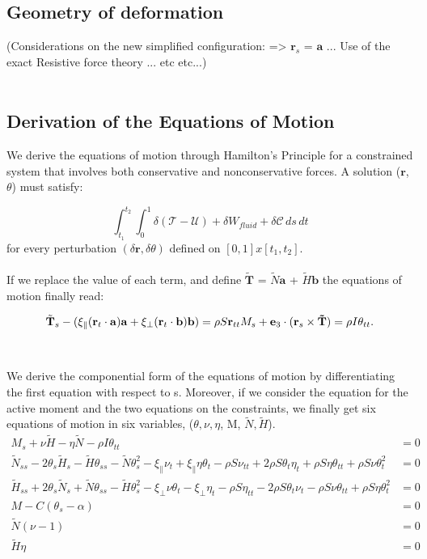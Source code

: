 \subsection{Geometry of deformation}
(Considerations on the new simplified configuration: => $\mathbf{r}_s$ = $\mathbf{a}$ ... Use of the exact Resistive force theory  ... etc etc...)
\\\\
\subsection{Derivation of the Equations of Motion}
We derive the equations of motion through Hamilton's Principle for a constrained system that involves both conservative and nonconservative forces. A solution ($\mathbf{r}$,$\theta$) must satisfy:

\[\int_{t_1}^{t_2} \int_{0}^{1} \delta (\mathcal{T}-\mathcal{U}) + \delta W_{fluid} + \delta \mathcal{C} \, ds \,dt
\]
for every perturbation $(\delta \mathbf{r}, \delta \theta)$ defined on $[0,1]x[t_1,t_2]$. 
\\\\
If we replace the value of each term, and define $\tilde{\mathbf{T}}$ = $\tilde{N}\mathbf{a}$ + $\tilde{H}\mathbf{b}$  the equations of motion finally read:

\[ \tilde{\mathbf{T}}_s - (\xi_\parallel (\mathbf{r}_t\cdot\mathbf{a})\mathbf{a} + \xi_\perp (\mathbf{r}_t\cdot\mathbf{b})\mathbf{b}) = \rho S \mathbf{r}_{tt}\\

M_s + \mathbf{e}_3 \cdot(\mathbf{r}_s \times \mathbf{\tilde{T}}) =\rho I \theta_{tt}.
\]
\\\\
We derive the componential form of the equations of motion by differentiating the first equation with respect to s.
Moreover, if we consider the equation for the active moment and the two equations on the constraints, we finally get six equations of motion in six variables, ($\theta,\nu,\eta$, M, $\tilde{N},\tilde{H}$).
\begin{align}
M_s + \nu \tilde{H} -\eta \tilde{N} - \rho I \theta_{tt}
&= 0\\
\tilde{N}_{ss} - 2\theta_s\tilde{H}_s - \tilde{H}\theta_{ss}- \tilde{N}\theta_s^2
- \xi_{\parallel}\nu_t + \xi_{\parallel}\eta\theta_t - \rho S \nu_{tt} + 2\rho S \theta_t\eta_t + \rho S \eta\theta_{tt} + \rho S \nu\theta_t^2
&= 0\\
\tilde{H}_{ss} + 2\theta_s\tilde{N}_s + \tilde{N}\theta_{ss} - \tilde{H}\theta_s^2  - \xi_{\perp}\nu\theta_t - \xi_{\perp}\eta_t
 - \rho S \eta_{tt} - 2\rho S \theta_t\nu_t -\rho S \nu\theta_{tt} + \rho S \eta\theta_t^2
&= 0\\
M - C(\theta_s -\alpha)  &= 0\\
\tilde{N}(\nu - 1) &= 0\\
\tilde{H}\eta &= 0
\end{align}

